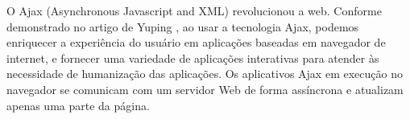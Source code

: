 O Ajax (Asynchronous Javascript and XML) revolucionou a web. Conforme demonstrado no artigo de Yuping \citep{6845605}, ao usar a tecnologia Ajax, podemos enriquecer a experiência do usuário em aplicações baseadas em navegador de internet, e fornecer uma variedade de aplicações interativas para atender às necessidade de humanização das aplicações.
Os aplicativos Ajax em execução no navegador se comunicam com um servidor Web de forma assíncrona e atualizam apenas uma parte da página.

